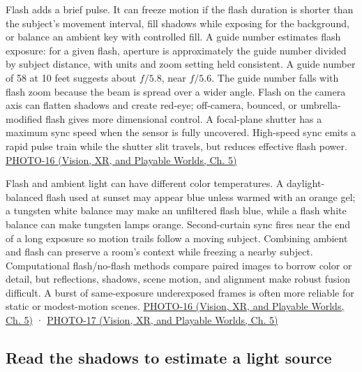 Flash adds a brief pulse. It can freeze motion if the flash duration is shorter than the subject's movement interval, fill shadows while exposing for the background, or balance an ambient key with controlled fill. A guide number estimates flash exposure: for a given flash, aperture is approximately the guide number divided by subject distance, with units and zoom setting held consistent. A guide number of 58 at 10 feet suggests about \(f/5.8\), near \(f/5.6\). The guide number falls with flash zoom because the beam is spread over a wider angle. Flash on the camera axis can flatten shadows and create red-eye; off-camera, bounced, or umbrella-modified flash gives more dimensional control. A focal-plane shutter has a maximum sync speed when the sensor is fully uncovered. High-speed sync emits a rapid pulse train while the shutter slit travels, but reduces effective flash power. \href{../07-Vision-XR-and-Playable-Worlds/main.pdf\#nameddest=04-visual-computing-ii-ch036-photo-16---photography-session-16}{PHOTO-16 (Vision, XR, and Playable Worlds, Ch. 5)}

Flash and ambient light can have different color temperatures. A daylight-balanced flash used at sunset may appear blue unless warmed with an orange gel; a tungsten white balance may make an unfiltered flash blue, while a flash white balance can make tungsten lamps orange. Second-curtain sync fires near the end of a long exposure so motion trails follow a moving subject. Combining ambient and flash can preserve a room's context while freezing a nearby subject. Computational flash/no-flash methods compare paired images to borrow color or detail, but reflections, shadows, scene motion, and alignment make robust fusion difficult. A burst of same-exposure underexposed frames is often more reliable for static or modest-motion scenes. \href{../07-Vision-XR-and-Playable-Worlds/main.pdf\#nameddest=04-visual-computing-ii-ch036-photo-16---photography-session-16}{PHOTO-16 (Vision, XR, and Playable Worlds, Ch. 5)} · \href{../07-Vision-XR-and-Playable-Worlds/main.pdf\#nameddest=04-visual-computing-ii-ch036-photo-17---photography-session-17}{PHOTO-17 (Vision, XR, and Playable Worlds, Ch. 5)}

\subsection{Read the shadows to estimate a light source}\label{03-visual-computing-i-ch004-read-the-shadows-to-estimate-a-light-source}

\hypertarget{03-visual-computing-i-ch004-read-the-shadows-to-estimate-a-light-source}{}


